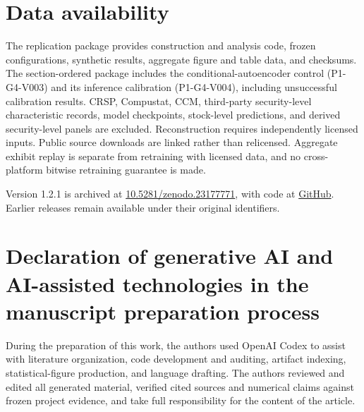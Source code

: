 \documentclass[preprint,12pt,authoryear]{elsarticle}
\begin{document}


\section*{Data availability}
The replication package provides construction and analysis code, frozen configurations, synthetic results, aggregate figure and table data, and checksums. The section-ordered package includes the conditional-autoencoder control (P1-G4-V003) and its inference calibration (P1-G4-V004), including unsuccessful calibration results. CRSP, Compustat, CCM, third-party security-level characteristic records, model checkpoints, stock-level predictions, and derived security-level panels are excluded. Reconstruction requires independently licensed inputs. Public source downloads are linked rather than relicensed. Aggregate exhibit replay is separate from retraining with licensed data, and no cross-platform bitwise retraining guarantee is made.

Version 1.2.1 is archived at \href{https://doi.org/10.5281/zenodo.23177771}{10.5281/zenodo.23177771}, with code at \href{https://github.com/extradimen/asset-pricing-dimension-replication}{GitHub}. Earlier releases remain available under their original identifiers.

\section*{Declaration of generative AI and AI-assisted technologies in the manuscript preparation process}
During the preparation of this work, the authors used OpenAI Codex to assist with literature organization, code development and auditing, artifact indexing, statistical-figure production, and language drafting. The authors reviewed and edited all generated material, verified cited sources and numerical claims against frozen project evidence, and take full responsibility for the content of the article.

\appendix
\setcounter{table}{0}
\renewcommand{\theHtable}{A.\arabic{table}}


\begingroup
\small
\raggedright
\setlength{\bibsep}{3pt}


\endgroup
\end{document}
